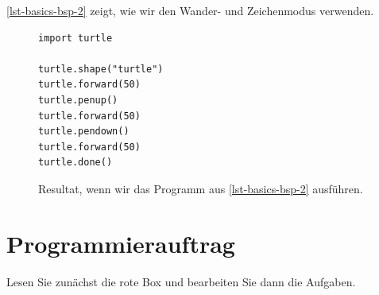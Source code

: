 \begin{example}

\autoref{lst-basics-bsp-2} zeigt, wie wir den Wander- und Zeichenmodus verwenden.

\begin{figure}[htb]
\centering
\begin{minipage}{0.5\linewidth}
\centering
\begin{lstlisting}[caption={Beispielprogramm, welches die Figur aus \autoref{figure-basics-bsp-2} zeichnet (\graybgtexttt{bsp\_2.py}).}, label=lst-basics-bsp-2]
import turtle

turtle.shape("turtle")
turtle.forward(50)
turtle.penup()
turtle.forward(50)
turtle.pendown()
turtle.forward(50)
turtle.done()
\end{lstlisting}
\end{minipage}
\hfill
\begin{minipage}[c]{0.4\linewidth}
\centering
{}
\caption{Resultat, wenn wir das Programm aus \autoref{lst-basics-bsp-2} ausführen.}
\label{figure-basics-bsp-2}
\end{minipage}
\end{figure}

\end{example}

\section{Programmierauftrag}

Lesen Sie zunächst die rote Box und bearbeiten Sie dann die Aufgaben.

